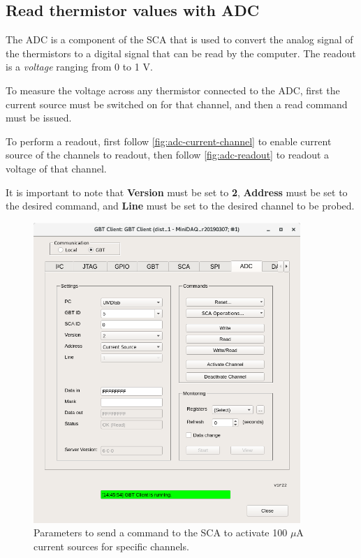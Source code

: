 \subsection{Read thermistor values with ADC}
The ADC is a component of the SCA that is used to convert the analog signal of
the thermistors to a digital signal that can be read by the computer.
The readout is a \emph{voltage} ranging from 0 to 1 V.

To measure the voltage across any thermistor connected to the ADC, first the
current source must be switched on for that channel, and then a read command
must be issued.

To perform a readout, first follow \autoref{fig:adc-current-channel} to enable
current source of the channels to readout,
then follow \autoref{fig:adc-readout} to readout a voltage of that channel.

It is important to note that \textbf{Version} must be set to \textbf{2},
\textbf{Address} must be set to the desired command, and \textbf{Line} must be
set to the desired channel to be probed.

\begin{figure}[ht]
    \centering
    \includegraphics[width=0.9\textwidth]{res/gbt_client_adc_readout_currentsource.png}
    \caption{
        Parameters to send a command to the SCA to activate 100 $\mu$A current
        sources for specific channels.
    }
    \label{fig:adc-current-channel}
\end{figure}

